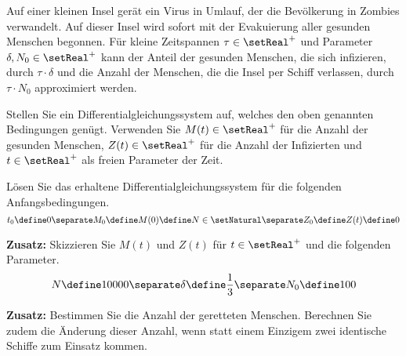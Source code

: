\begin{atiTask}[
	title = Ein Ausweg aus der Zombieapokalypse
]
	Auf einer kleinen Insel gerät ein Virus in Umlauf, der die Bevölkerung in Zombies verwandelt.
	Auf dieser Insel wird sofort mit der Evakuierung aller gesunden Menschen begonnen.
	Für kleine  Zeitspannen $\tau\in\setReal^+$ und Parameter $\delta,N_0\in\setReal^+$ kann der Anteil der gesunden Menschen, die sich infizieren, durch $\tau\cdot\delta$ und die Anzahl der Menschen, die die Insel per Schiff verlassen, durch $\tau\cdot N_0$ approximiert werden.
	\begin{atiSubtasks}
		\item{
			Stellen Sie ein Differentialgleichungssystem auf, welches den oben genannten Bedingungen genügt.
			Verwenden Sie $M(t)\in\setReal^+$ für die Anzahl der gesunden Menschen, $Z(t)\in\setReal^+$ für die Anzahl der Infizierten und $t\in\setReal^+$ als freien Parameter der Zeit.
		}
		\item{
			Lösen Sie das erhaltene Differentialgleichungssystem für die folgenden Anfangsbedingungen.
			\[
				t_0 \define 0
				\separate
				M_0\define M(0)\define N\in\setNatural
				\separate
				Z_0\define Z(t) \define 0
			\]
		}
		\item{
			\textbf{Zusatz:} Skizzieren Sie $M(t)$ und $Z(t)$ für $t\in\setReal^+$ und die folgenden Parameter.
			\[
				N \define 10000
				\separate
				\delta \define \frac{1}{3}
				\separate
				N_0 \define 100
			\]
		}
		\item{
			\textbf{Zusatz:}
			Bestimmen Sie die Anzahl der geretteten Menschen.
			Berechnen Sie zudem die Änderung dieser Anzahl, wenn statt einem Einzigem zwei identische Schiffe zum Einsatz kommen.
		}
	\end{atiSubtasks}
\end{atiTask}